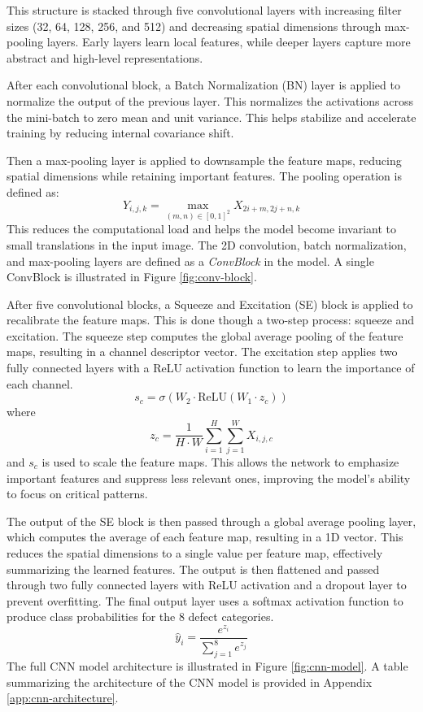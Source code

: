 \documentclass[conference]{IEEEtran}
\begin{document}
This structure is stacked through five convolutional layers with increasing filter sizes (32, 64, 128, 256, and 512) and decreasing spatial dimensions through max-pooling layers.
Early layers learn local features, while deeper layers capture more abstract and high-level representations.

After each convolutional block, a Batch Normalization (BN) layer is applied to normalize the output of the previous layer.
This normalizes the activations across the mini-batch to zero mean and unit variance.
This helps stabilize and accelerate training by reducing internal covariance shift.

Then a max-pooling layer is applied to downsample the feature maps, reducing spatial dimensions while retaining important features.
The pooling operation is defined as:
\begin{equation}
    Y_{i,j,k} = \max_{(m,n)\in [0,1]^2} X_{2i+m,2j+n,k}
\end{equation}
This reduces the computational load and helps the model become invariant to small translations in the input image.
The 2D convolution, batch normalization, and max-pooling layers are defined as a \textit{ConvBlock} in the model.
A single ConvBlock is illustrated in Figure \ref{fig:conv-block}.

After five convolutional blocks, a Squeeze and Excitation (SE) block is applied to recalibrate the feature maps.
This is done though a two-step process: squeeze and excitation.
The squeeze step computes the global average pooling of the feature maps, resulting in a channel descriptor vector.
The excitation step applies two fully connected layers with a ReLU activation function to learn the importance of each channel.
\begin{equation}
    s_c = \sigma(W_2 \cdot \text{ReLU}(W_1 \cdot z_c))
\end{equation}
where 
\begin{equation*}
    z_c = \frac{1}{H \cdot W} \sum_{i=1}^{H} \sum_{j=1}^{W} X_{i,j,c}
\end{equation*}
and \(s_c\) is used to scale the feature maps.
This allows the network to emphasize important features and suppress less relevant ones, improving the model's ability to focus on critical patterns.

The output of the SE block is then passed through a global average pooling layer, which computes the average of each feature map, resulting in a 1D vector.
This reduces the spatial dimensions to a single value per feature map, effectively summarizing the learned features.
The output is then flattened and passed through two fully connected layers with ReLU activation and a dropout layer to prevent overfitting.
The final output layer uses a softmax activation function to produce class probabilities for the 8 defect categories.
\begin{equation}
    \hat{y}_i = \frac{e^{z_i}}{\sum_{j=1}^{8} e^{z_j}}
\end{equation}
The full CNN model architecture is illustrated in Figure \ref{fig:cnn-model}.
A table summarizing the architecture of the CNN model is provided in Appendix \ref{app:cnn-architecture}.
\end{document}
